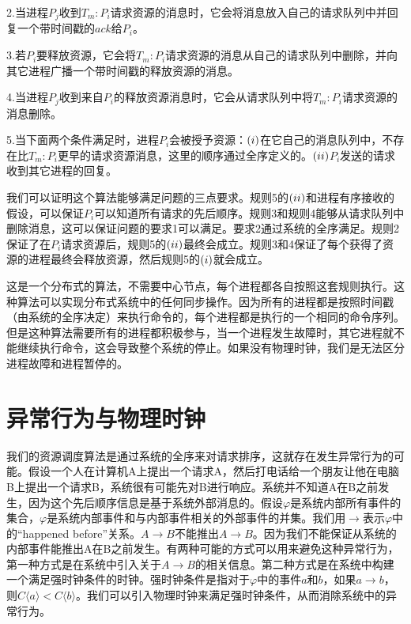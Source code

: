 \documentclass[UTF8]{article}
\begin{document}
	2.当进程$P_j$收到$T_m:P_i$请求资源的消息时，它会将消息放入自己的请求队列中并回复一个带时间戳的$ack$给$P_i$。

	3.若$P_i$要释放资源，它会将$T_m:P_i$请求资源的消息从自己的请求队列中删除，并向其它进程广播一个带时间戳的释放资源的消息。

	4.当进程$P_j$收到来自$P_i$的释放资源消息时，它会从请求队列中将$T_m:P_i$请求资源的消息删除。
	
	5.当下面两个条件满足时，进程$P_i$会被授予资源：$(\romannumeral1)$在它自己的消息队列中，不存在比$T_m:P_i$更早的请求资源消息，这里的顺序通过全序定义的。$(\romannumeral2)$$P_i$发送的请求收到其它进程的回复。

	我们可以证明这个算法能够满足问题的三点要求。规则5的$(\romannumeral2)$和进程有序接收的假设，可以保证$P_i$可以知道所有请求的先后顺序。规则3和规则4能够从请求队列中删除消息，这可以保证问题的要求1可以满足。要求2通过系统的全序满足。规则2保证了在$P_i$请求资源后，规则5的$(\romannumeral2)$最终会成立。规则3和4保证了每个获得了资源的进程最终会释放资源，然后规则5的$(\romannumeral1)$就会成立。

	这是一个分布式的算法，不需要中心节点，每个进程都各自按照这套规则执行。这种算法可以实现分布式系统中的任何同步操作。因为所有的进程都是按照时间戳（由系统的全序决定）来执行命令的，每个进程都是执行的一个相同的命令序列。但是这种算法需要所有的进程都积极参与，当一个进程发生故障时，其它进程就不能继续执行命令，这会导致整个系统的停止。如果没有物理时钟，我们是无法区分进程故障和进程暂停的。

\section{异常行为与物理时钟}

	我们的资源调度算法是通过系统的全序来对请求排序，这就存在发生异常行为的可能。假设一个人在计算机A上提出一个请求A，然后打电话给一个朋友让他在电脑B上提出一个请求B，系统很有可能先对B进行响应。系统并不知道A在B之前发生，因为这个先后顺序信息是基于系统外部消息的。假设$\varphi$是系统内部所有事件的集合，\underline{$\varphi$}是系统内部事件和与内部事件相关的外部事件的并集。我们用$\boldsymbol{\rightarrow}$表示\underline{$\varphi$}中的“happened before”关系。$A \boldsymbol{\rightarrow} B$不能推出$A \rightarrow B$。因为我们不能保证从系统的内部事件能推出A在B之前发生。有两种可能的方式可以用来避免这种异常行为，第一种方式是在系统中引入关于$A \boldsymbol{\rightarrow} B$的相关信息。第二种方式是在系统中构建一个满足强时钟条件的时钟。强时钟条件是指对于$\varphi$中的事件$a$和$b$，如果$a \boldsymbol{\rightarrow} b$，则$C\langle a \rangle < C\langle b\rangle$。我们可以引入物理时钟来满足强时钟条件，从而消除系统中的异常行为。
\end{document}
